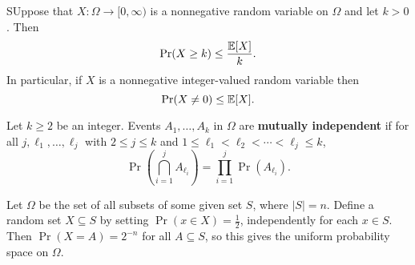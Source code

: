 \begin{definition}
    SUppose that \(X: \Omega \to [0, \infty)\) is a nonnegative random variable on \(\Omega\) and let \(k > 0\). Then
    \[\Pr(X \geq k) \leq \frac{\mathbb{E}[X]}{k}.\]
    In particular, if \(X\) is a nonnegative integer-valued random variable then
    \[\Pr(X \neq 0) \leq \mathbb{E}[X].\]
\end{definition}

Let \(k \geq 2\) be an integer. Events \(A_1, \dots, A_k\) in \(\Omega\) are \textbf{mutually independent} if for all \(j, \ell_1, \dots, \ell_j\) with \(2 \leq j \leq k\) and \(1 \leq \ell_1 < \ell_2 < \cdots < \ell_j \leq k\),
\[\Pr\left(\bigcap_{i=1}^j A_{\ell_i}\right) = \prod_{i = 1}^j \Pr(A_{\ell_i}).\]

\begin{lemma}
    Let \(\Omega\) be the set of all subsets of some given set \(S\), where \(|S| = n\). Define a random set \(X \subseteq S\) by setting \(\Pr(x \in X) = \frac{1}{2}\), independently for each \(x \in S\). Then \(\Pr(X = A) = 2^{-n}\) for all \(A \subseteq S\), so this gives the uniform probability space on \(\Omega\).
\end{lemma}

